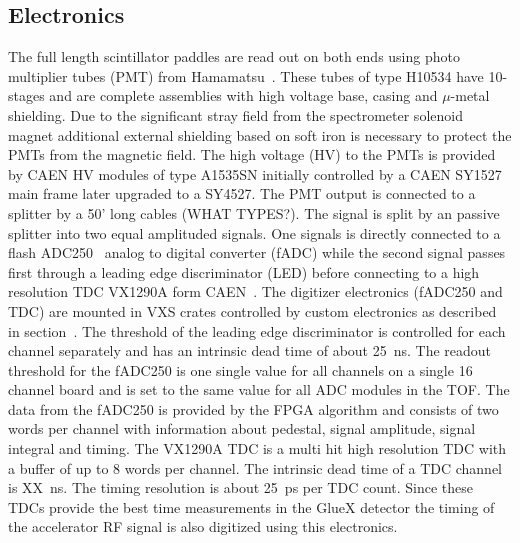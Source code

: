 \subsection{Electronics \label{sec:scelectronics}}
The full length scintillator paddles are read out on both ends using photo multiplier tubes (PMT) from Hamamatsu~\cite{HamamatsuPhotonics}. These tubes of type H10534 have 10-stages and are complete assemblies with high voltage base, casing and $\mu$-metal shielding. Due to the significant stray field from the spectrometer solenoid magnet additional external
shielding based on soft iron is necessary to protect the PMTs from the magnetic field.
The high voltage (HV) to the PMTs is provided by CAEN HV modules of type A1535SN initially controlled by a CAEN SY1527 main frame
later upgraded to a SY4527.
The PMT output is connected to a splitter by a 50' long cables (WHAT TYPES?). The signal is split by
an passive splitter into two equal amplituded signals. One signals is directly connected to a flash ADC250~\cite{Dong:2007}
analog to digital converter (fADC) while the second signal passes first through a leading edge discriminator (LED) before connecting to 
a high resolution TDC VX1290A form CAEN~\cite{CAENCompany}. The digitizer electronics (fADC250 and TDC) are mounted
in VXS crates controlled by custom electronics as described in section~\label{sec:online}.
The threshold of the leading edge discriminator is controlled for each channel separately and has an intrinsic
dead time of about 25~ns.
The readout threshold for
the fADC250 is one single value for all channels on a single 16 channel board and is set to the same value for
all ADC modules in the TOF. The data from the fADC250 is provided by the FPGA algorithm and consists
of two words per channel with information about pedestal, signal amplitude, signal integral and timing.
The VX1290A TDC is a multi hit high resolution TDC with a buffer of 
up to 8 words per channel. The intrinsic dead time of a TDC channel is XX~ns. The timing resolution is about 25~ps per TDC count.
Since these TDCs provide the best time measurements in the GlueX detector the timing of the accelerator RF signal is also
digitized using this electronics.

